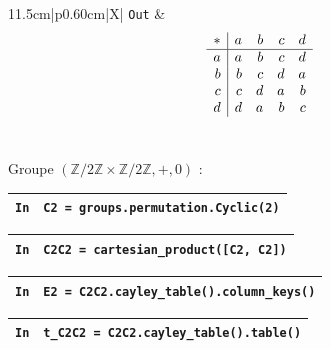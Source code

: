 \documentclass[titlepage]{article}
\begin{document}
        \begin{tabularx}{11.5cm}{|p{0.60cm}|X|}
            \hline
            \verb|Out|
            & 
            {\setlength{\arraycolsep}{2ex}
            \[\begin{array}{r|*{4}{r}}
                \multicolumn{1}{c|}{\ast}&a&b&c&d\\\hline
                {}a&a&b&c&d\\
                {}b&b&c&d&a\\
                {}c&c&d&a&b\\
                {}d&d&a&b&c\\
            \end{array}\]}
            \\
            \hline
        \end{tabularx}

        \vspace*{6mm}
        Groupe $(\mathbb{Z}/2\mathbb{Z} \times \mathbb{Z}/2\mathbb{Z}, +, 0)$ :
        \vspace*{2mm}
        
        \begin{tabularx}{11.5cm}{|p{0.60cm}|X|}
            \hline
            \verb|In|
            & 
            \verb|C2 = groups.permutation.Cyclic(2)|
            \\
            \hline
        \end{tabularx}

        \begin{tabularx}{11.5cm}{|p{0.60cm}|X|}
            \hline
            \verb|In|
            & 
            \verb|C2C2 = cartesian_product([C2, C2])|
            \\
            \hline
        \end{tabularx}
            
        \begin{tabularx}{11.5cm}{|p{0.60cm}|X|}
            \hline
            \verb|In|
            & 
            \verb|E2 = C2C2.cayley_table().column_keys()|
            \\
            \hline
        \end{tabularx}

        \begin{tabularx}{11.5cm}{|p{0.60cm}|X|}
            \hline
            \verb|In|
            & 
            \verb|t_C2C2 = C2C2.cayley_table().table()|
            \\
            \hline
        \end{tabularx}
\end{document}
